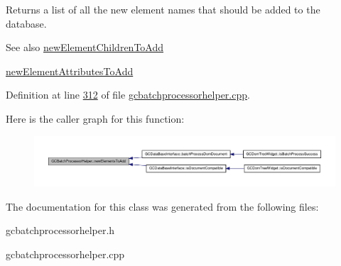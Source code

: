 \-Returns a list of all the new element names that should be added to the database. 

\begin{DoxySeeAlso}{\-See also}
\hyperlink{class_g_c_batch_processor_helper_a89c14c3740c7cb57c937ef8db99b4af1}{new\-Element\-Children\-To\-Add} 

\hyperlink{class_g_c_batch_processor_helper_a640ca9bd78b7da0796fdfb82fefce8b6}{new\-Element\-Attributes\-To\-Add} 
\end{DoxySeeAlso}


\-Definition at line \hyperlink{gcbatchprocessorhelper_8cpp_source_l00312}{312} of file \hyperlink{gcbatchprocessorhelper_8cpp_source}{gcbatchprocessorhelper.\-cpp}.



\-Here is the caller graph for this function\-:\nopagebreak
\begin{figure}[H]
\begin{center}
\leavevmode
\includegraphics[width=350pt]{class_g_c_batch_processor_helper_afdedbc674698c019ebd2a3938a239661_icgraph}
\end{center}
\end{figure}




\-The documentation for this class was generated from the following files\-:\begin{DoxyCompactItemize}
\item 
gcbatchprocessorhelper.\-h\item 
gcbatchprocessorhelper.\-cpp\end{DoxyCompactItemize}
